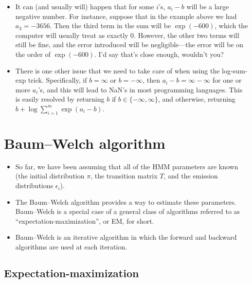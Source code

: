 \documentclass[12pt]{article}
\begin{document}
\begin{itemize}
\item It can (and usually will) happen that for some $i$'s, $a_i-b$ will be a large negative number.  For instance, suppose that in the example above we had $a_3 = -3656$. Then the third term in the sum will be $\exp(-600)$, which the computer will usually treat as exactly $0$. However, the other two terms will still be fine, and the error introduced will be negligible---the error will be on the order of $\exp(-600)$.  I'd say that's close enough, wouldn't you?
\item There is one other issue that we need to take care of when using the log-sum-exp trick. Specifically, if $b=\infty$ or $b=-\infty$, then $a_i-b = \infty-\infty$ for one or more $a_i$'s, and this will lead to NaN's in most programming languages. This is easily resolved by returning $b$ if $b\in\{-\infty,\infty\}$, and otherwise, returning $b + \log \sum_{i = 1}^m \exp(a_i-b)$.
\end{itemize}


\section[Baum--Welch algorithm (for HMM parameter estimation)]{Baum--Welch algorithm}

\begin{itemize}
\item So far, we have been assuming that all of the HMM parameters are known (the initial distribution $\pi$, the transition matrix $T$, and the emission distributions $\epsilon_i$).
\item The Baum--Welch algorithm provides a way to estimate these parameters. Baum--Welch is a special case of a general class of algorithms referred to as ``expectation-maximization'', or EM, for short.
\item Baum--Welch is an iterative algorithm in which the forward and backward algorithms are used at each iteration.
\end{itemize}

\subsection{Expectation-maximization}
\end{document}
